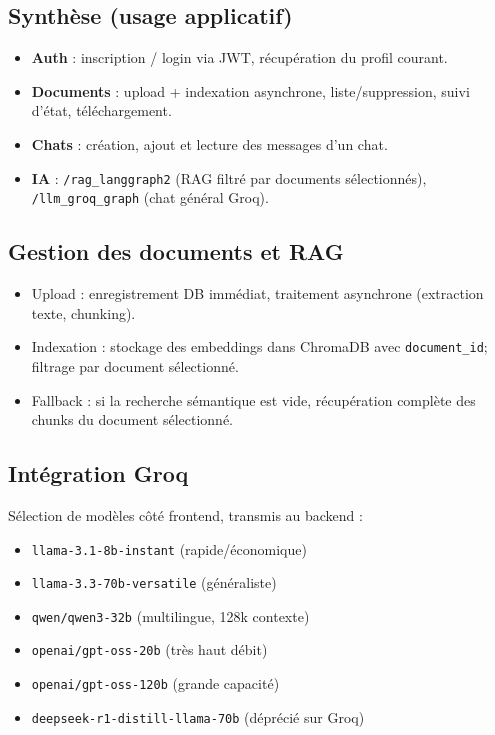 \subsection{Synthèse (usage applicatif)}
\begin{itemize}
    \item \textbf{Auth} : inscription / login via JWT, récupération du profil courant.
    \item \textbf{Documents} : upload + indexation asynchrone, liste/suppression, suivi d'état, téléchargement.
    \item \textbf{Chats} : création, ajout et lecture des messages d'un chat.
    \item \textbf{IA} : \texttt{/rag\_langgraph2} (RAG filtré par documents sélectionnés), \texttt{/llm\_groq\_graph} (chat général Groq).
\end{itemize}

\subsection{Gestion des documents et RAG}
\begin{itemize}
    \item Upload : enregistrement DB immédiat, traitement asynchrone (extraction texte, chunking).
    \item Indexation : stockage des embeddings dans ChromaDB avec \texttt{document\_id}; filtrage par document sélectionné.
    \item Fallback : si la recherche sémantique est vide, récupération complète des chunks du document sélectionné.
\end{itemize}

\subsection{Intégration Groq}
Sélection de modèles côté frontend, transmis au backend :
\begin{itemize}
    \item \texttt{llama-3.1-8b-instant} (rapide/économique)
    \item \texttt{llama-3.3-70b-versatile} (généraliste)
    \item \texttt{qwen/qwen3-32b} (multilingue, 128k contexte)
    \item \texttt{openai/gpt-oss-20b} (très haut débit)
    \item \texttt{openai/gpt-oss-120b} (grande capacité)
    \item \texttt{deepseek-r1-distill-llama-70b} (déprécié sur Groq)
\end{itemize}

